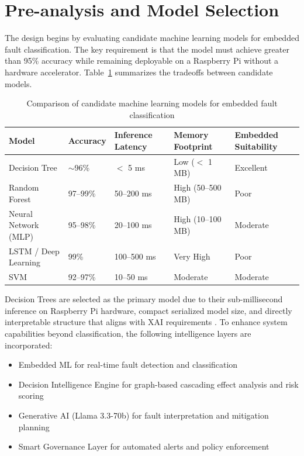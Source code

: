 \section{Pre-analysis and Model Selection}

The design begins by evaluating candidate machine learning models for embedded fault classification. The key requirement is that the model must achieve greater than 95\% accuracy while remaining deployable on a Raspberry Pi without a hardware accelerator. Table~\ref{c3:tab:model_comparison} summarizes the tradeoffs between candidate models.

\begin{table}[H]
\centering
\fontsize{10}{12}\selectfont
\begin{tabular}{|p{3.5cm}|p{2.2cm}|p{2.2cm}|p{2.2cm}|p{2.5cm}|}
\hline
\textbf{Model} & \textbf{Accuracy} & \textbf{Inference Latency} & \textbf{Memory Footprint} & \textbf{Embedded Suitability} \\
\hline
Decision Tree & $\sim$96\% & $<$ 5 ms & Low ($<$ 1 MB) & Excellent \\
\hline
Random Forest & 97--99\% \cite{Anwar2025} & 50--200 ms & High (50--500 MB) & Poor \\
\hline
Neural Network (MLP) & 95--98\% & 20--100 ms & High (10--100 MB) & Moderate \\
\hline
LSTM / Deep Learning & 99\% \cite{LSTM2023} & 100--500 ms & Very High & Poor \\
\hline
SVM & 92--97\% & 10--50 ms & Moderate & Moderate \\
\hline
\end{tabular}
\caption{Comparison of candidate machine learning models for embedded fault classification}
\label{c3:tab:model_comparison}
\end{table}

Decision Trees are selected as the primary model due to their sub-millisecond inference on Raspberry Pi hardware, compact serialized model size, and directly interpretable structure that aligns with XAI requirements \cite{CNNDecisionTree2026}. To enhance system capabilities beyond classification, the following intelligence layers are incorporated:
\begin{itemize}
\setlength{\itemsep}{0pt}
\setlength{\parskip}{0pt}
\setlength{\parsep}{0pt}
\item Embedded ML for real-time fault detection and classification
\item Decision Intelligence Engine for graph-based cascading effect analysis and risk scoring
\item Generative AI (Llama 3.3-70b) for fault interpretation and mitigation planning
\item Smart Governance Layer for automated alerts and policy enforcement
\end{itemize}


